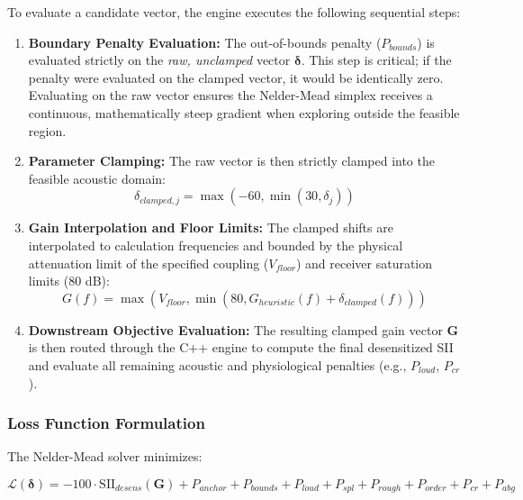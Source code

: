 \documentclass[
  12pt,
]{article}
\providecommand{\tightlist}{%
  \setlength{\itemsep}{0pt}\setlength{\parskip}{0pt}}
\begin{document}
To evaluate a candidate vector, the engine executes the following
sequential steps:

\begin{enumerate}
\def\labelenumi{\arabic{enumi}.}
\tightlist
\item
  \textbf{Boundary Penalty Evaluation:} The out-of-bounds penalty
  (\(P_{bounds}\)) is evaluated strictly on the \emph{raw, unclamped}
  vector \(\boldsymbol{\delta}\). This step is critical; if the penalty
  were evaluated on the clamped vector, it would be identically zero.
  Evaluating on the raw vector ensures the Nelder-Mead simplex receives
  a continuous, mathematically steep gradient when exploring outside the
  feasible region.
\item
  \textbf{Parameter Clamping:} The raw vector is then strictly clamped
  into the feasible acoustic domain: \begin{equation}
  \delta_{clamped, j} = \max(-60, \min(30, \delta_j))
  \end{equation}
\item
  \textbf{Gain Interpolation and Floor Limits:} The clamped shifts are
  interpolated to calculation frequencies and bounded by the physical
  attenuation limit of the specified coupling (\(V_{floor}\)) and
  receiver saturation limits (80 dB): \begin{equation}
  G(f) = \max\left(V_{floor}, \min\left(80, G_{heuristic}(f) + \delta_{clamped}(f)\right)\right)
  \end{equation}
\item
  \textbf{Downstream Objective Evaluation:} The resulting clamped gain
  vector \(\mathbf{G}\) is then routed through the C++ engine to compute
  the final desensitized SII and evaluate all remaining acoustic and
  physiological penalties (e.g., \(P_{loud}\), \(P_{cr}\)).
\end{enumerate}

\subsubsection{Loss Function
Formulation}\label{loss-function-formulation}

The Nelder-Mead solver minimizes:

\begin{equation}
\mathcal{L}(\boldsymbol{\delta}) = -100 \cdot \text{SII}_{desens}(\mathbf{G}) + P_{anchor} + P_{bounds} + P_{loud} + P_{spl} + P_{rough} + P_{order} + P_{cr} + P_{abg}
\end{equation}
\end{document}
